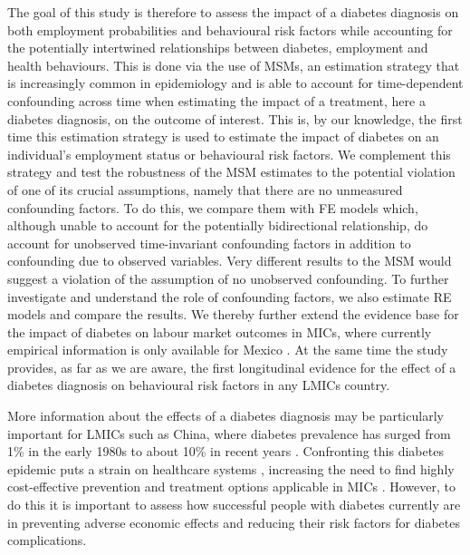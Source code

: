The goal of this study is therefore to assess the impact of a diabetes diagnosis on both employment probabilities and behavioural risk factors while accounting for the potentially intertwined relationships between diabetes, employment and health behaviours. This is done via the use of \acp{MSM}, an estimation strategy that is increasingly common in epidemiology and is able to account for time-dependent confounding across time \parencite{Robins2000} when estimating the impact of a treatment, here a diabetes diagnosis, on the outcome of interest. This is, by our knowledge, the first time this estimation strategy is used to estimate the impact of diabetes on an individual's employment status or behavioural risk factors. We complement this strategy and test the robustness of the \ac{MSM} estimates to the potential violation of one of its crucial assumptions, namely that there are no unmeasured confounding factors. To do this, we compare them with \ac{FE} models which, although unable to account for the potentially bidirectional relationship, do account for unobserved time-invariant confounding factors in addition to confounding due to observed variables. Very different results to the \ac{MSM} would suggest a violation of the assumption of no unobserved confounding. To further investigate and understand the role of confounding factors, we also estimate \ac{RE} models and compare the results.  We thereby further extend the evidence base for the impact of diabetes on labour market outcomes in \acp{MIC}, where currently empirical information is only available for Mexico \parencite{Seuring2016}. At the same time the study provides, as far as we are aware, the first longitudinal evidence for the effect of a diabetes diagnosis on behavioural risk factors in any \acp{LMIC}  country.

 
More information about the effects of a diabetes diagnosis may be particularly important for \acp{LMIC} such as China, where diabetes prevalence has surged from 1\% in the early 1980s to about 10\% in recent years \autocite{Hu2011,Risk2016}. Confronting this diabetes epidemic puts a strain on healthcare systems \parencite{Seuring2015a}, increasing the need to find highly cost-effective prevention and treatment options applicable in \acp{MIC} \parencite{WHOresearchpriorities2010}. However, to do this it is important to assess how successful people with diabetes currently are in preventing adverse economic effects and reducing their risk factors for diabetes complications.




